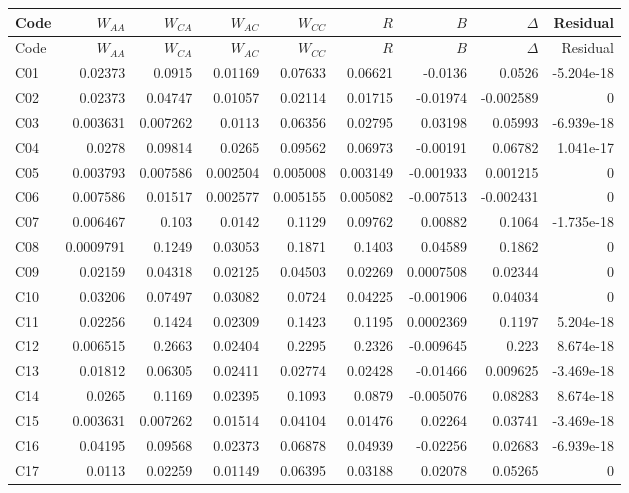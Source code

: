 \documentclass[10pt]{article}
\begin{document}
\small\setlength{\tabcolsep}{6pt}\begin{longtable}{@{}lrrrrrrrr@{}}
\toprule Code & $W_{AA}$ & $W_{CA}$ & $W_{AC}$ & $W_{CC}$ & $R$ & $B$ & $\Delta$ & Residual\\\midrule\endfirsthead
\toprule Code & $W_{AA}$ & $W_{CA}$ & $W_{AC}$ & $W_{CC}$ & $R$ & $B$ & $\Delta$ & Residual\\\midrule\endhead\bottomrule\endfoot
C01 & 0.02373 & 0.0915 & 0.01169 & 0.07633 & 0.06621 & -0.0136 & 0.0526 & -5.204e-18\\[1pt]
C02 & 0.02373 & 0.04747 & 0.01057 & 0.02114 & 0.01715 & -0.01974 & -0.002589 & 0\\[1pt]
C03 & 0.003631 & 0.007262 & 0.0113 & 0.06356 & 0.02795 & 0.03198 & 0.05993 & -6.939e-18\\[1pt]
C04 & 0.0278 & 0.09814 & 0.0265 & 0.09562 & 0.06973 & -0.00191 & 0.06782 & 1.041e-17\\[1pt]
C05 & 0.003793 & 0.007586 & 0.002504 & 0.005008 & 0.003149 & -0.001933 & 0.001215 & 0\\[1pt]
C06 & 0.007586 & 0.01517 & 0.002577 & 0.005155 & 0.005082 & -0.007513 & -0.002431 & 0\\[1pt]
C07 & 0.006467 & 0.103 & 0.0142 & 0.1129 & 0.09762 & 0.00882 & 0.1064 & -1.735e-18\\[1pt]
C08 & 0.0009791 & 0.1249 & 0.03053 & 0.1871 & 0.1403 & 0.04589 & 0.1862 & 0\\[1pt]
C09 & 0.02159 & 0.04318 & 0.02125 & 0.04503 & 0.02269 & 0.0007508 & 0.02344 & 0\\[1pt]
C10 & 0.03206 & 0.07497 & 0.03082 & 0.0724 & 0.04225 & -0.001906 & 0.04034 & 0\\[1pt]
C11 & 0.02256 & 0.1424 & 0.02309 & 0.1423 & 0.1195 & 0.0002369 & 0.1197 & 5.204e-18\\[1pt]
C12 & 0.006515 & 0.2663 & 0.02404 & 0.2295 & 0.2326 & -0.009645 & 0.223 & 8.674e-18\\[1pt]
C13 & 0.01812 & 0.06305 & 0.02411 & 0.02774 & 0.02428 & -0.01466 & 0.009625 & -3.469e-18\\[1pt]
C14 & 0.0265 & 0.1169 & 0.02395 & 0.1093 & 0.0879 & -0.005076 & 0.08283 & 8.674e-18\\[1pt]
C15 & 0.003631 & 0.007262 & 0.01514 & 0.04104 & 0.01476 & 0.02264 & 0.03741 & -3.469e-18\\[1pt]
C16 & 0.04195 & 0.09568 & 0.02373 & 0.06878 & 0.04939 & -0.02256 & 0.02683 & -6.939e-18\\[1pt]
C17 & 0.0113 & 0.02259 & 0.01149 & 0.06395 & 0.03188 & 0.02078 & 0.05265 & 0\\[1pt]

\end{longtable}
\end{document}
